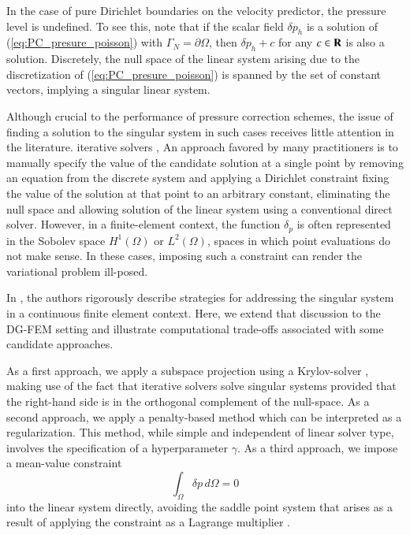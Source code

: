 In the case of pure Dirichlet boundaries on the velocity predictor, the pressure level is undefined. 
To see this, note that if the scalar field $\delta p_h$ is a solution of (\ref{eq:PC_presure_poisson}) with $\Gamma_N = \partial \Omega$, then $\delta p_h + c$ for any $c \in {\mbox{\bf R}}$ is also a solution. 
Discretely, the null space of the linear system arising due to the discretization of (\ref{eq:PC_presure_poisson}) is spanned by the set of constant vectors, implying a singular linear system.


Although crucial to the performance of pressure correction schemes, the issue of finding a solution to the singular system in such cases receives little attention in the literature. 
iterative solvers \cite{axelsson_iterative_1996,iankov_finite_2013}, 
An approach favored by many practitioners is to manually specify the value of the candidate solution at a single point by removing an equation from the discrete system and applying a Dirichlet constraint fixing the value of the solution at that point to an arbitrary constant, eliminating the null space and allowing solution of the linear system using a conventional direct solver.
However, in a finite-element context, the function $\delta_p$ is often represented in the Sobolev space $H^1(\Omega)$ or $L^2(\Omega)$, spaces in which point evaluations do not make sense. 
In these cases, imposing such a constraint can render the variational problem ill-posed.



In \cite{bochev_finite_2005}, the authors rigorously describe strategies for addressing the singular system in a continuous finite element context. 
Here, we extend that discussion to the DG-FEM setting and illustrate computational trade-offs associated with some candidate approaches.

As a first approach, we apply a subspace projection using a Krylov-solver \cite{vorst_iterative_2003}, making use of the fact that iterative solvers solve singular systems provided that the right-hand side is in the orthogonal complement of the null-space.
As a second approach, we apply a penalty-based method which can be interpreted as a regularization.
This method, while simple and independent of linear solver type, involves the specification of a hyperparameter $\gamma$.
As a third approach, we impose a mean-value constraint 
\begin{equation}
  \int_{\Omega}^{} \delta p \,d\Omega = 0
  \label{eq:mean_value_zero_condition}
\end{equation}
into the linear system directly, avoiding the saddle point system that arises as a result of applying the constraint as a Lagrange multiplier \cite{bochev_finite_2005}.

